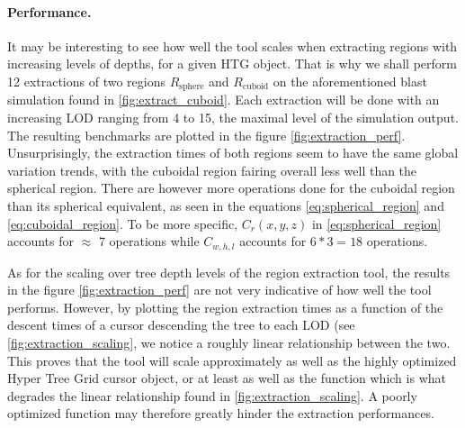 \documentclass[
	a4paper,
	12pt,
	raggedright,
	twoside
]{tufte-style-article}
\newcommand{\py}[1]{\inlinecode{python}{#1}}
\theoremstyle{definition}
\theoremstyle{remark}
\begin{document}
\paragraph{Performance.} It may be interesting to see how well the tool scales when extracting regions with increasing levels of depths, for a given \Gls{HTG} object. That is why we shall perform 12 extractions of two regions $R_\text{sphere}$ and $R_\text{cuboid}$ on the aforementioned blast simulation found in \ref{fig:extract_cuboid}. Each extraction will be done with an increasing \Gls{LOD} ranging from 4 to 15, the maximal level of the simulation output. The resulting benchmarks are plotted in the figure \ref{fig:extraction_perf}. Unsurprisingly, the extraction times of both regions seem to have the same global variation trends, with the cuboidal region fairing overall less well than the spherical region. There are however more operations done for the cuboidal region than its spherical equivalent, as seen in the equations \ref{eq:spherical_region} and \ref{eq:cuboidal_region}. To be more specific, $C_r(x,y,z)$ in \ref{eq:spherical_region} accounts for $\approx$ 7 operations while  $C_{w, h, l}$ accounts for $6*3=18$ operations.

As for the scaling over tree depth levels of the region extraction tool, the results in the figure \ref{fig:extraction_perf} are not very indicative of how well the tool performs. However, by plotting the region extraction times as a function of the descent times of a cursor descending the tree to each \Gls{LOD} (see \ref{fig:extraction_scaling}, we notice a roughly linear relationship between the two. This proves that the tool will scale approximately as well as the highly optimized Hyper Tree Grid cursor object, or at least as well as the function \py{isInRegion()} which is what degrades the linear relationship found in \ref{fig:extraction_scaling}. A poorly optimized \py{isInRegion()} function may therefore greatly hinder the extraction performances.

\begin{figure}[h!]
    \centering
    
\end{figure}
\begin{figure}[h!]
    \centering
    
\end{figure}
\end{document}

